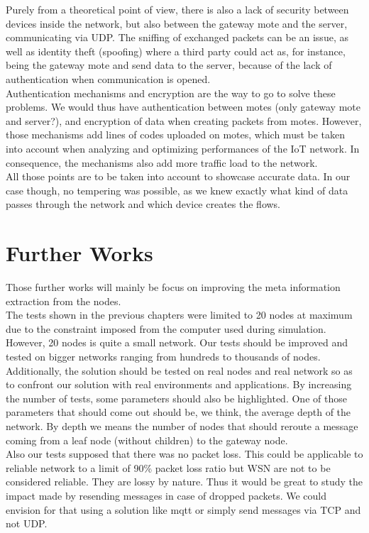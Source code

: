 Purely from a theoretical point of view, there is also a lack of security between devices inside the network, but also between the gateway mote and the server, communicating via UDP. The sniffing of exchanged packets can be an issue, as well as identity theft (spoofing) where a third party could act as, for instance, being the gateway mote and send data to the server, because of the lack of authentication when communication is opened. \\

Authentication mechanisms and encryption are the way to go to solve these problems. We would thus have authentication between motes (only gateway mote and server?), and encryption of data when creating packets from motes. However, those mechanisms add lines of codes uploaded on motes, which must be taken into account when analyzing and optimizing performances of the IoT network. In consequence, the mechanisms also add more traffic load to the network.\\

All those points are to be taken into account to showcase accurate data. In our case though, no tempering was possible, as we knew exactly what kind of data passes through the network and which device creates the flows.

\section{Further Works}

Those further works will mainly be focus on improving the meta information extraction from the nodes.\\

The tests shown in the previous chapters were limited to 20 nodes at maximum due to the constraint imposed from the computer used during simulation. However, 20 nodes is quite a small network. Our tests should be improved and tested on bigger networks ranging from hundreds to thousands of nodes. Additionally, the solution should be tested on real nodes and real network so as to confront our solution with real environments and applications. By increasing the number of tests, some parameters should also be highlighted. One of those parameters that should come out should be, we think, the average depth of the network. By depth we means the number of nodes that should reroute a message coming from a leaf node (without children) to the gateway node.\\

Also our tests supposed that there was no packet loss. This could be applicable to reliable network to a limit of 90\% packet loss ratio but WSN are not to be considered reliable. They are lossy by nature. Thus it would be great to study the impact made by resending messages in case of dropped packets. We could envision for that using a solution like \acrshort{mqtt} \cite{website:mqtt} or simply send messages via TCP and not UDP.\\

